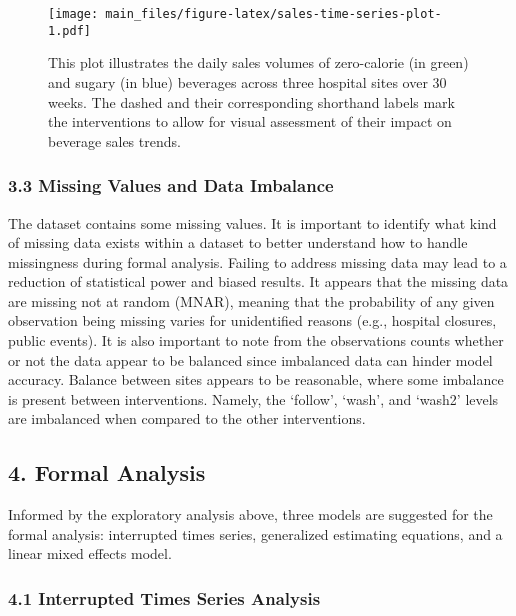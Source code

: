 \documentclass[
]{article}
\begin{document}
\begin{figure}
\centering
\texttt{[image: main\_files/figure-latex/sales-time-series-plot-1.pdf]}
\caption{This plot illustrates the daily sales volumes of zero-calorie
(in green) and sugary (in blue) beverages across three hospital sites
over 30 weeks. The dashed and their corresponding shorthand labels mark
the interventions to allow for visual assessment of their impact on
beverage sales trends.}
\end{figure}

\hypertarget{missing-values-and-data-imbalance}{%
\subsubsection{3.3 Missing Values and Data
Imbalance}\label{missing-values-and-data-imbalance}}

The dataset contains some missing values. It is important to identify
what kind of missing data exists within a dataset to better understand
how to handle missingness during formal analysis. Failing to address
missing data may lead to a reduction of statistical power and biased
results. It appears that the missing data are missing not at random
(MNAR), meaning that the probability of any given observation being
missing varies for unidentified reasons (e.g., hospital closures, public
events). It is also important to note from the observations counts
whether or not the data appear to be balanced since imbalanced data can
hinder model accuracy. Balance between sites appears to be reasonable,
where some imbalance is present between interventions. Namely, the
`follow', `wash', and `wash2' levels are imbalanced when compared to the
other interventions.

\hypertarget{formal-analysis}{%
\subsection{4. Formal Analysis}\label{formal-analysis}}

Informed by the exploratory analysis above, three models are suggested
for the formal analysis: interrupted times series, generalized
estimating equations, and a linear mixed effects model.

\hypertarget{interrupted-times-series-analysis}{%
\subsubsection{4.1 Interrupted Times Series
Analysis}\label{interrupted-times-series-analysis}}
\end{document}
